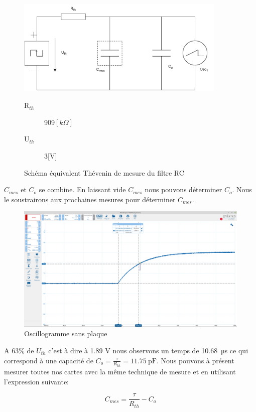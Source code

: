 \begin{figure}[!ht]
\centering
 \includegraphics[width=10cm]{schemaMesureTH.pdf}
 \begin{description}
 \item[R$_{th}$] 909$[k\Omega]$
 \item[U$_{th}$] 3[V]
\end{description}
 \caption{Schéma équivalent Thévenin de mesure du filtre RC}
\end{figure}

$C_{mes}$ et $C_o$ se combine. En laissant vide $C_{mes}$ nous pouvons déterminer $C_o$. Nous le soustrairons aux prochaines mesures pour déterminer $C_{mes}$.

\begin{figure}[!ht]
\centering
 \includegraphics[width=14cm]{videe.png}
 \caption{Oscillogramme sans plaque}
\end{figure}

A 63\% de $U_{th}$ c'est à dire à 1.89 V nous observons un temps de \SI{10.68}{\micro\second} ce qui correspond à une capacité de $C_o = \frac{\tau}{R_{th}}= \SI{11.75}{\pico\farad}$. Nous pouvons à présent mesurer toutes nos cartes avec la même technique de mesure et en utilisant l'expression suivante:

\begin{equation}
 C_{mes} = \frac{\tau}{R_{th}} - C_o
\end{equation}

